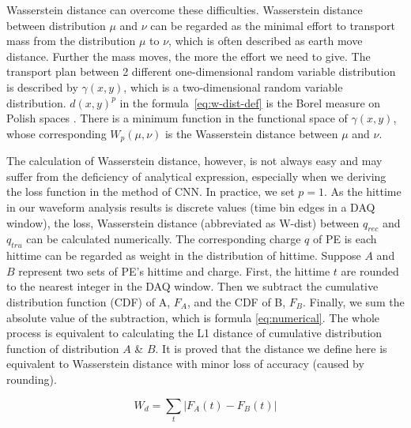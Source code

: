 Wasserstein distance can overcome these difficulties. Wasserstein distance between distribution $\mu$ and $\nu$ can be regarded as the minimal effort to transport mass from the distribution $\mu$ to $\nu$, which is often described as earth move distance. Further the mass moves, the more the effort we need to give. The transport plan between 2 different one-dimensional random variable distribution is described by $\gamma(x, y)$, which is a two-dimensional random variable distribution. $d(x,y)^{p}$ in the formula~\eqref{eq:w-dist-def} is the Borel measure on Polish spaces \cite{villani_2009}. There is a minimum function in the functional space of $\gamma(x, y)$, whose corresponding $W_{p}(\mu,\nu)$ is the Wasserstein distance between $\mu$ and $\nu$. 

The calculation of Wasserstein distance, however, is not always easy and may suffer from the deficiency of analytical expression, especially when we deriving the loss function in the method of CNN. In practice, we set $p=1$. As the hittime in our waveform analysis results is discrete values (time bin edges in a DAQ window), the loss, Wasserstein distance (abbreviated as W-dist) between $q_{rec}$ and $q_{tru}$ can be calculated numerically. The corresponding charge $q$ of PE is each hittime can be regarded as weight in the distribution of hittime. Suppose $A$ and $B$ represent two sets of PE's hittime and charge. First, the hittime $t$ are rounded to the nearest integer in the DAQ window. Then we subtract the cumulative distribution function (CDF) of A, $F_{A}$, and the CDF of B, $F_{B}$. Finally, we sum the absolute value of the subtraction, which is formula \eqref{eq:numerical}. The whole process is equivalent to calculating the L1 distance of cumulative distribution function of distribution $A$ \& $B$. It is proved that the distance we define here is equivalent to Wasserstein distance with minor loss of accuracy (caused by rounding). 

\begin{equation}
    W_{d} = \sum_t|F_{A}(t) - F_{B}(t)|
    \label{eq:numerical}
\end{equation}

